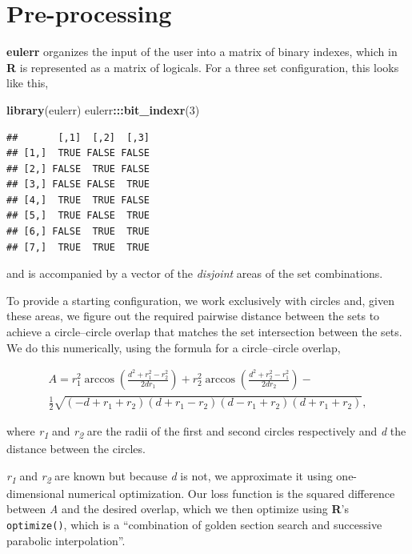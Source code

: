 \documentclass[
  headsepline=true,headings=standardclasses%
]{scrartcl}
\newenvironment{Shaded}{\begin{snugshade}}{\end{snugshade}}
\newcommand{\KeywordTok}[1]{\textcolor[rgb]{0.13,0.29,0.53}{\textbf{#1}}}
\newcommand{\DecValTok}[1]{\textcolor[rgb]{0.00,0.00,0.81}{#1}}
\newcommand{\OperatorTok}[1]{\textcolor[rgb]{0.81,0.36,0.00}{\textbf{#1}}}
\newcommand{\NormalTok}[1]{#1}
\theoremstyle{definition}
\theoremstyle{definition}
\theoremstyle{remark}
\begin{document}
\section{Pre-processing}\label{pre-processing}

\textbf{eulerr} organizes the input of the user into a matrix of binary
indexes, which in \textbf{R} is represented as a matrix of logicals. For
a three set configuration, this looks like this,

\begin{Shaded}
\begin{Highlighting}[]
\KeywordTok{library}\NormalTok{(eulerr)}
\NormalTok{eulerr}\OperatorTok{:::}\KeywordTok{bit_indexr}\NormalTok{(}\DecValTok{3}\NormalTok{)}
\end{Highlighting}
\end{Shaded}

\begin{verbatim}
##       [,1]  [,2]  [,3]
## [1,]  TRUE FALSE FALSE
## [2,] FALSE  TRUE FALSE
## [3,] FALSE FALSE  TRUE
## [4,]  TRUE  TRUE FALSE
## [5,]  TRUE FALSE  TRUE
## [6,] FALSE  TRUE  TRUE
## [7,]  TRUE  TRUE  TRUE
\end{verbatim}

and is accompanied by a vector of the \emph{disjoint} areas of the set
combinations.

To provide a starting configuration, we work exclusively with circles
and, given these areas, we figure out the required pairwise distance
between the sets to achieve a circle--circle overlap that matches the
set intersection between the sets. We do this numerically, using the
formula for a circle--circle overlap,

\begin{multline}
A = r_1^2\arccos\left(\frac{d^2 + r_1^2 - r_2^2}{2dr_1}\right) + 
r_2^2\arccos\left(\frac{d^2 + r_2^2 - r_1^2}{2dr_2}\right) - \\
\frac{1}{2}\sqrt{(-d + r_1 + r_2)(d + r_1 - r_2)(d - r_1 + r_2)(d + r_1 + r_2)},
\end{multline}

where \emph{r\textsubscript{1}} and \emph{r\textsubscript{2}} are the
radii of the first and second circles respectively and \emph{d} the
distance between the circles.

\emph{r\textsubscript{1}} and \emph{r\textsubscript{2}} are known but
because \emph{d} is not, we approximate it using one-dimensional
numerical optimization. Our loss function is the squared difference
between \emph{A} and the desired overlap, which we then optimize using
\textbf{R}'s \texttt{optimize()}, which is a ``combination of golden
section search and successive parabolic interpolation''.
\end{document}
